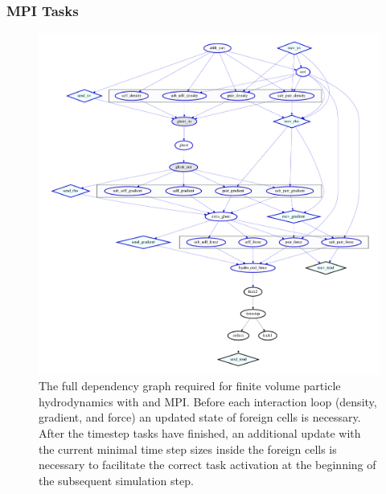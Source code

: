 \subsubsection{MPI Tasks}



\begin{figure}
 \centering
 \includegraphics[width=\textwidth]{figures/Meshless/tasks_hydro_only.pdf}
 \caption{
The full dependency graph required for finite volume particle hydrodynamics with \swift and MPI.
Before each
interaction loop (density, gradient, and force) an updated state of foreign cells is necessary.
After the timestep tasks have finished, an additional update with the current minimal time step
sizes inside the foreign cells is necessary to facilitate the correct task activation at the
beginning of the subsequent simulation step.
}
 \label{fig:dependency-graph-hydro}
\end{figure}


